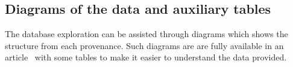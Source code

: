																																																																																																																																																																																																																																																																																																																																																																																																																																																								\subsection{Diagrams of the data and auxiliary tables}
																																																																																																																																																																																																																																																																																																																																																																																																																																																								The database exploration can be assisted through diagrams which shows
																																																																																																																																																																																																																																																																																																																																																																																																																																																								the structure from each provenance.
																																																																																																																																																																																																																																																																																																																																																																																																																																																								Such diagrams are
																																																																																																																																																																																																																																																																																																																																																																																																																																																								are fully available in an article~\cite{losd}
																																																																																																																																																																																																																																																																																																																																																																																																																																																								with some tables to make it easier to understand the data provided.
